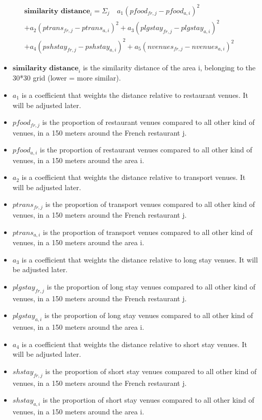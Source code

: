 \documentclass[12pt,a4paper]{article}
\begin{document}
\begin{multline}
	\textbf{similarity distance}_{i} =  \Sigma_{j} \quad a_1 (pfood_{fr,j} - pfood_{a,i})^2  \\ + a_2 (ptrans_{fr,j} - ptrans_{a,i})^2 
	+ a_3  (plgstay_{fr,j} - plgstay_{a,i})^2  \\ + a_4 (pshstay_{fr,j} - pshstay_{a,i})^2 + a_5 (nvenues_{fr,j} - nvenues_{a,i})^2
\end{multline}

\medskip

\begin{itemize}
  \item $\textbf{similarity distance}_{i}$ is the similarity distance of the area i, belonging to the 30*30 grid (lower = more similar).
  
  \item $a_1$ is a coefficient that weights the distance relative to restaurant venues. It will be adjusted later.
  \item $pfood_{fr,j}$ is the proportion of restaurant venues compared to all other kind of venues, in a 150 meters around the French restaurant j.
  \item $pfood_{a,i}$ is the proportion of restaurant venues compared to all other kind of venues, in a 150 meters around the area i.
  
  \item $a_2$ is a coefficient that weights the distance relative to transport venues. It will be adjusted later.
  \item $ptrans_{fr,j}$ is the proportion of transport venues compared to all other kind of venues, in a 150 meters around the French restaurant j.
  \item $ptrans_{a,i}$ is the proportion of transport venues compared to all other kind of venues, in a 150 meters around the area i.
  
  \item $a_3$ is a coefficient that weights the distance relative to long stay venues. It will be adjusted later.
  \item $plgstay_{fr,j}$ is the proportion of long stay  venues compared to all other kind of venues, in a 150 meters around the French restaurant j.
  \item $plgstay_{a,i}$ is the proportion of long stay  venues compared to all other kind of venues, in a 150 meters around the area i.
  
  \item $a_4$ is a coefficient that weights the distance relative to short stay venues. It will be adjusted later.
  \item $shstay_{fr,j}$ is the proportion of short stay venues compared to all other kind of venues, in a 150 meters around the French restaurant j.
  \item $shstay_{a,i}$ is the proportion of short stay venues compared to all other kind of venues, in a 150 meters around the area i.
  

\end{itemize}
\end{document}
